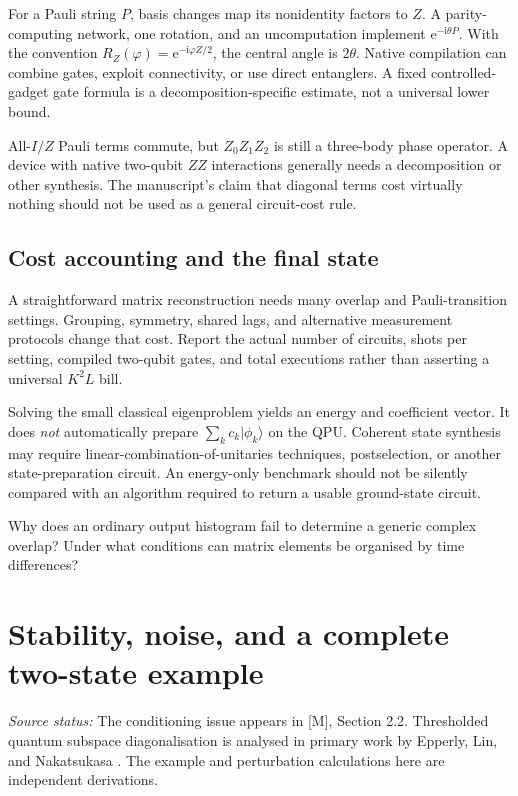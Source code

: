 \documentclass[11pt,a4paper,oneside]{report}
\newcommand{\ket}[1]{\lvert #1\rangle}
\newcommand{\I}{\mathrm i}
\newcommand{\e}{\mathrm e}
\newcommand{\src}[1]{\par{\small\color{grey}\textit{Source status:} #1}\par}
\newcommand{\checkpoint}[1]{\begin{idea}[Check your understanding]#1\end{idea}}
\begin{document}
For a Pauli string $P$, basis changes map its nonidentity factors to $Z$. A parity-computing network, one rotation, and an uncomputation implement $\e^{-\I\theta P}$. With the convention $R_Z(\varphi)=\e^{-\I\varphi Z/2}$, the central angle is $2\theta$. Native compilation can combine gates, exploit connectivity, or use direct entanglers. A fixed controlled-gadget gate formula is a decomposition-specific estimate, not a universal lower bound.

\begin{caution}
All-$I/Z$ Pauli terms commute, but $Z_0Z_1Z_2$ is still a three-body phase operator. A device with native two-qubit $ZZ$ interactions generally needs a decomposition or other synthesis. The manuscript's claim that diagonal terms cost virtually nothing should not be used as a general circuit-cost rule.
\end{caution}

\section{Cost accounting and the final state}
A straightforward matrix reconstruction needs many overlap and Pauli-transition settings. Grouping, symmetry, shared lags, and alternative measurement protocols change that cost. Report the actual number of circuits, shots per setting, compiled two-qubit gates, and total executions rather than asserting a universal $K^2L$ bill.

Solving the small classical eigenproblem yields an energy and coefficient vector. It does \emph{not} automatically prepare $\sum_kc_k\ket{\phi_k}$ on the QPU. Coherent state synthesis may require linear-combination-of-unitaries techniques, postselection, or another state-preparation circuit. An energy-only benchmark should not be silently compared with an algorithm required to return a usable ground-state circuit.

\checkpoint{Why does an ordinary output histogram fail to determine a generic complex overlap? Under what conditions can matrix elements be organised by time differences?}

\chapter{Stability, noise, and a complete two-state example}\label{ch:stability}
\src{The conditioning issue appears in [M], Section 2.2. Thresholded quantum subspace diagonalisation is analysed in primary work by Epperly, Lin, and Nakatsukasa \cite{epperly}. The example and perturbation calculations here are independent derivations.}
\end{document}
